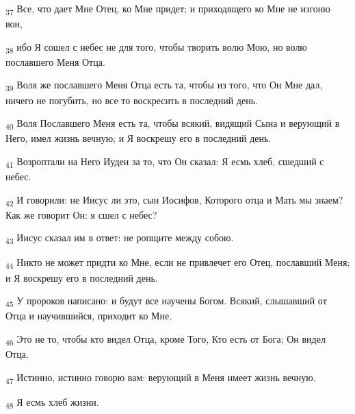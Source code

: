 \begin{tcolorbox}
\textsubscript{37} Все, что дает Мне Отец, ко Мне придет; и приходящего ко Мне не изгоню вон,
\end{tcolorbox}
\begin{tcolorbox}
\textsubscript{38} ибо Я сошел с небес не для того, чтобы творить волю Мою, но волю пославшего Меня Отца.
\end{tcolorbox}
\begin{tcolorbox}
\textsubscript{39} Воля же пославшего Меня Отца есть та, чтобы из того, что Он Мне дал, ничего не погубить, но все то воскресить в последний день.
\end{tcolorbox}
\begin{tcolorbox}
\textsubscript{40} Воля Пославшего Меня есть та, чтобы всякий, видящий Сына и верующий в Него, имел жизнь вечную; и Я воскрешу его в последний день.
\end{tcolorbox}
\begin{tcolorbox}
\textsubscript{41} Возроптали на Него Иудеи за то, что Он сказал: Я есмь хлеб, сшедший с небес.
\end{tcolorbox}
\begin{tcolorbox}
\textsubscript{42} И говорили: не Иисус ли это, сын Иосифов, Которого отца и Мать мы знаем? Как же говорит Он: я сшел с небес?
\end{tcolorbox}
\begin{tcolorbox}
\textsubscript{43} Иисус сказал им в ответ: не ропщите между собою.
\end{tcolorbox}
\begin{tcolorbox}
\textsubscript{44} Никто не может придти ко Мне, если не привлечет его Отец, пославший Меня; и Я воскрешу его в последний день.
\end{tcolorbox}
\begin{tcolorbox}
\textsubscript{45} У пророков написано: и будут все научены Богом. Всякий, слышавший от Отца и научившийся, приходит ко Мне.
\end{tcolorbox}
\begin{tcolorbox}
\textsubscript{46} Это не то, чтобы кто видел Отца, кроме Того, Кто есть от Бога; Он видел Отца.
\end{tcolorbox}
\begin{tcolorbox}
\textsubscript{47} Истинно, истинно говорю вам: верующий в Меня имеет жизнь вечную.
\end{tcolorbox}
\begin{tcolorbox}
\textsubscript{48} Я есмь хлеб жизни.
\end{tcolorbox}

